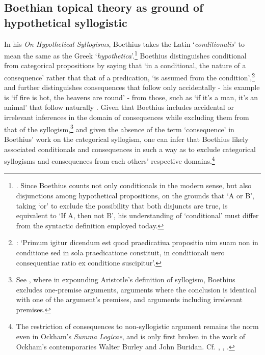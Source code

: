 \documentclass[a4paper, 11pt]{article}
\begin{document}
\subsection{Boethian topical theory as ground of hypothetical syllogistic}
In his \emph{On Hypothetical Syllogisms}, 
Boethius takes the Latin `\emph{conditionalis}' to mean the same as the Greek `\emph{hypothetica}'.\footnote{\autocite[1.3.2]{BHS}. Since Boethius counts not only conditionals in the modern sense, 
	but also disjunctions among hypothetical propositions, 
	on the grounds that `A or B', taking `or' to exclude the possibility that both disjuncts are true, 
	is equivalent to `If A, then not B', 
	his understanding of `conditional' must differ from the syntactic definition employed today.} 
Boethius distinguishes conditional from categorical propositions by saying that `in a conditional, 
the nature of a consequence' rather that that of a predication, `is assumed from the condition',\footnote{\autocite[1.1.6]{BHS}: `Primum igitur dicendum est quod praedicatiua propositio uim suam non in conditione sed in sola praedicatione constituit, in conditionali uero consequentiae ratio ex conditione suscipitur'.} 
and further distinguishes consequences that follow only accidentally 
- his example is `if fire is hot, the heavens are round' - 
from those, such as `if it's a man, it's an animal' that follow naturally \autocite[1.3.6-1.3.7]{BHS}. 
Given that Boethius includes accidental or irrelevant inferences in the domain of consequences while excluding them from that of the syllogism,\footnote{See \autocite[821]{BSC}, where in expounding Aristotle's definition of syllogism, Boethius excludes one-premise arguments, arguments where the conclusion is identical with one of the argument's premises, and arguments including irrelevant premises.} 
and given the absence of the term `consequence' in Boethius' work on the categorical syllogism, 
one can infer that Boethius likely associated conditionals and consequences in such a way as to exclude categorical syllogisms and consequences from each others' respective domains.\footnote{The restriction of consequences to non-syllogistic argument remains the norm even in Ockham's \emph{Summa Logicae}, 
	and is only first broken in the work of Ockham's contemporaries Walter Burley and John Buridan. 
	Cf. \autocite[295]{Archambault2018b}, \autocite[141.26-30, 219.1-9]{BurleyDPAL}, \autocite[passim]{BuridanTC}.}
\end{document}
